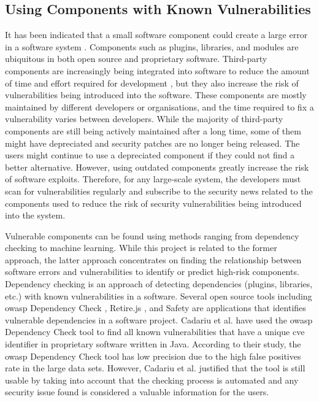 \documentclass[12pt, a4paper]{report}
\begin{document}
\subsection{Using Components with Known Vulnerabilities} \label{subsec:components}
It has been indicated that a small software component could create a large error in a software
system \cite{basili_1984, munson_1992, selby_1988}. Components such as plugins, libraries, and
modules are ubiquitous in both open source and proprietary software. Third-party components are
increasingly being integrated into software to reduce the amount of time and effort required for
development \cite{balzarotti_2006}, but they also increase the risk of vulnerabilities being
introduced into the software. These components are mostly maintained by different developers or
organisations, and the time required to fix a vulnerability varies between developers. While the
majority of third-party components are still being actively maintained after a long time, some of
them might have depreciated and security patches are no longer being released. The users might
continue to use a depreciated component if they could not find a better alternative. However, using
outdated components greatly increase the risk of software exploits. Therefore, for any large-scale
system, the developers must scan for vulnerabilities regularly and subscribe to the security news
related to the components used to reduce the risk of security vulnerabilities being introduced into
the system.

Vulnerable components can be found using methods ranging from dependency checking to machine
learning. While this project is related to the former approach, the latter approach concentrates on
finding the relationship between software errors and vulnerabilities to identify or predict
high-risk components. Dependency checking is an approach of detecting dependencies (plugins,
libraries, etc.) with known vulnerabilities in a software. Several open source tools including
\acrshort{owasp} Dependency Check \cite{owasp_dependency}, Retire.js \cite{retirejs}, and Safety
\cite{safety} are applications that identifies vulnerable dependencies in a software project.
Cadariu et al. \cite{cadariu_2015} have used the \acrshort{owasp} Dependency Check tool to find all
known vulnerabilities that have a unique \acrshort{cve} identifier in proprietary software written
in Java. According to their study, the \acrshort{owasp} Dependency Check tool has low precision due
to the high false positives rate in the large data sets. However, Cadariu et al. \cite{cadariu_2015}
justified that the tool is still usable by taking into account that the checking process is
automated and any security issue found is considered a valuable information for the users.
\end{document}
